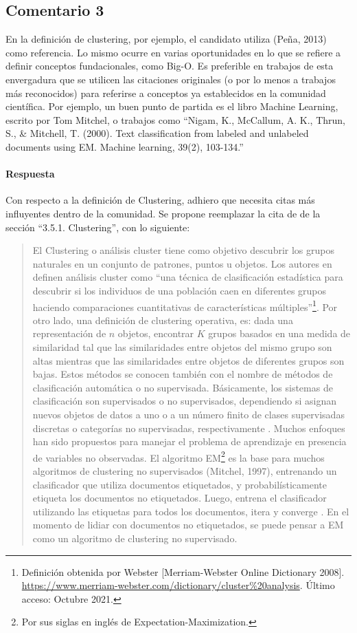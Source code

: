 \subsection*{Comentario 3}
En la definición de clustering, por ejemplo, el candidato utiliza (Peña, 2013) como referencia. Lo mismo ocurre en varias oportunidades en lo que se refiere a definir conceptos fundacionales, como Big-O. Es preferible en trabajos de esta envergadura que se utilicen las citaciones originales (o por lo menos a trabajos más reconocidos) para referirse a conceptos ya establecidos en la comunidad científica. Por ejemplo, un buen punto de partida es el libro Machine Learning, escrito por Tom Mitchel, o trabajos como ``Nigam, K., McCallum, A. K., Thrun, S., \& Mitchell, T. (2000). Text classification from labeled and unlabeled documents using EM. Machine learning, 39(2), 103-134.''

\paragraph*{Respuesta}
Con respecto a la definición de Clustering, adhiero que necesita citas más influyentes dentro de la comunidad. Se propone reemplazar la cita de \citep{pena2013analisis} de la sección ``3.5.1. Clustering'', con lo siguiente:

\begin{quotation}
	El Clustering o análisis cluster tiene como objetivo descubrir los grupos naturales en un conjunto de patrones, puntos u objetos. Los autores en \citep{jain2010data} definen análisis cluster como ``una técnica de clasificación estadística para descubrir si los individuos de una población caen en diferentes grupos haciendo comparaciones cuantitativas de características múltiples''\footnote{Definición obtenida por Webster [Merriam-Webster Online Dictionary 2008]. \url{https://www.merriam-webster.com/dictionary/cluster\%20analysis}. Último acceso: Octubre 2021.}. Por otro lado, una definición de clustering operativa, es: dada una representación de \(n\) objetos, encontrar \(K\) grupos basados en una medida de similaridad tal que las similaridades entre objetos del mismo grupo son altas mientras que las similaridades entre objetos de diferentes grupos son bajas. Estos métodos se conocen también con el nombre de métodos de clasificación automática o no supervisada. Básicamente, los sistemas de clasificación son supervisados o no supervisados, dependiendo si asignan nuevos objetos de datos a uno o a un número finito de clases supervisadas discretas o categorías no supervisadas, respectivamente \citep{xu2008clustering}. Muchos enfoques han sido propuestos para manejar el problema de aprendizaje en presencia de variables no observadas. El algoritmo EM\footnote{Por sus siglas en inglés de Expectation-Maximization.} es la base para muchos algoritmos de clustering no supervisados (Mitchel, 1997), entrenando un clasificador que utiliza documentos etiquetados, y probabilísticamente etiqueta los documentos no etiquetados. Luego, entrena el clasificador utilizando las etiquetas para todos los documentos, itera y converge \citep{nigam2000text}. En el momento de lidiar con documentos no etiquetados, se puede pensar a EM como un algoritmo de clustering no supervisado.
\end{quotation}

